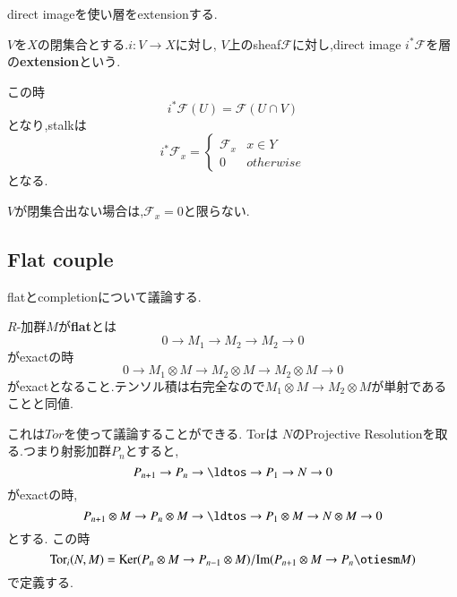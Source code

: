 direct imageを使い層をextensionする.
\begin{screen}
\begin{dfn}
$V$を$X$の閉集合とする.$i : V \to X$に対し,
$V$上のsheaf$\mathcal{F}$に対し,direct image $i^*\mathcal{F}$を層の\textbf{extension}という.

この時
\begin{equation*}
    i^* \mathcal{F}(U) = \mathcal{F}(U \cap V)
\end{equation*}
となり,stalkは
\begin{equation*}
    i^*\mathcal{F}_x = \begin{cases}
        \mathcal{F}_x & x \in Y \\
        0 & otherwise
    \end{cases}
\end{equation*}
となる.
\end{dfn}
\end{screen}

\begin{rem}
  $V$が閉集合出ない場合は,$\mathcal{F}_x = 0$と限らない.
\end{rem}

\subsection{Flat couple}
flatとcompletionについて議論する.

\begin{screen}
\begin{dfn}
$R$-加群$M$が\textbf{flat}とは
\begin{equation*}
 0 \to M_1 \to M_2 \to M_2 \to 0
\end{equation*}
がexactの時
\begin{equation*}
 0 \to M_1 \otimes M \to M_2 \otimes M\to M_2 \otimes M \to 0
\end{equation*}
がexactとなること.テンソル積は右完全なので$M_1 \otimes M \to M_2 \otimes M$が単射であることと同値.
\end{dfn}
\end{screen}

これは$Tor$を使って議論することができる.
Torは
$N$のProjective Resolutionを取る.つまり射影加群$P_n$とすると,
\begin{equation*}
P_{n+1} \to P_n \to \ldtos \to P_1 \to N \to 0
\end{equation*}
がexactの時,
\begin{equation*}
P_{n+1} \otimes M \to P_n \otimes M  \to \ldtos \to P_1 \otimes M \to N \otimes M \to 0
\end{equation*}
とする.
この時
\begin{equation*}
\mathrm{Tor}_i(N, M) = \mathrm{Ker}(P_n \otimes M \to P_{n-1} \otimes M) / \mathrm{Im}(P_{n+1} \otimes M  \to P_n \otiesm M)
\end{equation*}
で定義する.

